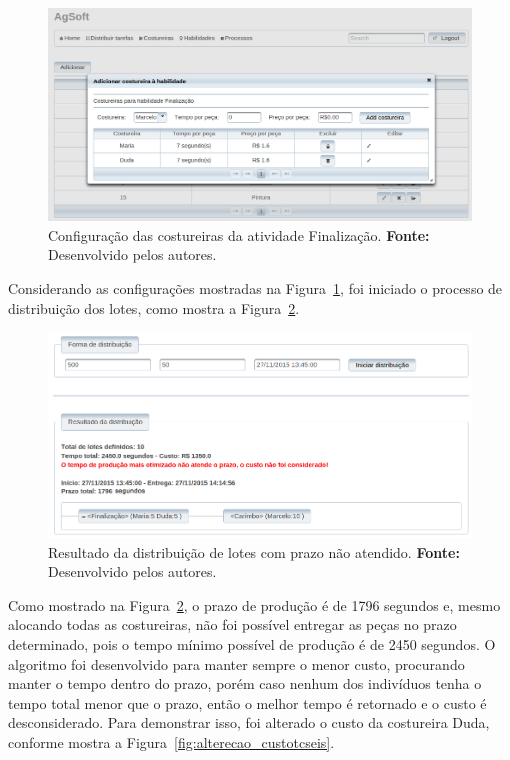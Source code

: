 \begin{figure}[h!]
	\centerline{\includegraphics[width=14.7cm]{./imagens/configuracao_costureiras_teste6.png}}
	\caption[Configuração das costureiras da atividade Finalização.] 
	{Configuração das costureiras da atividade Finalização. \textbf{Fonte:} Desenvolvido pelos
	autores.}
	\label{fig:configuracao_costureiras_teste6}
\end{figure}

\par Considerando as configurações mostradas na
Figura~\ref{fig:configuracao_costureiras_teste6}, foi iniciado o processo de
distribuição dos lotes, como mostra a Figura~\ref{fig:resultado1_teste6}.

\newpage

\begin{figure}[h!]
	\centerline{\includegraphics[width=13cm]{./imagens/resultado1_teste6.png}}
	\caption[Resultado da distribuição de lotes com prazo não atendido.] 
	{Resultado da distribuição de lotes com prazo não atendido. \textbf{Fonte:} Desenvolvido pelos
	autores.}
	\label{fig:resultado1_teste6}
\end{figure}

\par Como mostrado na Figura~\ref{fig:resultado1_teste6}, o prazo de produção
é de 1796 segundos e, mesmo alocando todas as costureiras, não foi possível
entregar as peças no prazo determinado, pois o tempo mínimo possível de produção
é de 2450 segundos. O algoritmo foi desenvolvido para manter sempre o menor custo, procurando manter o tempo
dentro do prazo, porém caso nenhum dos indivíduos tenha o tempo total menor que o prazo,
então o melhor tempo é retornado e o custo é desconsiderado.
Para demonstrar isso, foi alterado o custo da costureira Duda, conforme mostra a
Figura~\ref{fig:alterecao_custotcseis}.
 

